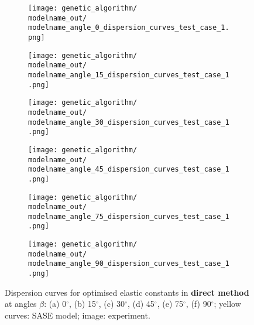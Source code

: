 \documentclass[preprint,12pt]{elsarticle}
\begin{document}
\clearpage

\begin{figure} [h!]
	\newcommand{\modelname}{ga_plain_weave_C_tensor_known_mass}
	\centering
	\begin{subfigure}[b]{0.49\textwidth}
		\centering
		
\texttt{[image: genetic\_algorithm/\\modelname\_out/\\modelname\_angle\_0\_dispersion\_curves\_test\_case\_1.png]}
		\caption{}
		\label{fig:dispersion0deg_direct}
	\end{subfigure}
	\begin{subfigure}[b]{0.49\textwidth}
		\centering
		
\texttt{[image: genetic\_algorithm/\\modelname\_out/\\modelname\_angle\_15\_dispersion\_curves\_test\_case\_1.png]}
		\caption{}
		\label{fig:dispersion15deg_direct}
	\end{subfigure}
	\begin{subfigure}[b]{0.49\textwidth}
		\centering
		
\texttt{[image: genetic\_algorithm/\\modelname\_out/\\modelname\_angle\_30\_dispersion\_curves\_test\_case\_1.png]}
		\caption{}
		\label{fig:dispersion30deg_direct}
	\end{subfigure}
	\begin{subfigure}[b]{0.49\textwidth}
		\centering
		
\texttt{[image: genetic\_algorithm/\\modelname\_out/\\modelname\_angle\_45\_dispersion\_curves\_test\_case\_1.png]}
		\caption{}
		\label{fig:dispersion45deg_direct}
	\end{subfigure}
	\begin{subfigure}[b]{0.49\textwidth}
		\centering
		
\texttt{[image: genetic\_algorithm/\\modelname\_out/\\modelname\_angle\_75\_dispersion\_curves\_test\_case\_1.png]}
		\caption{}
		\label{fig:dispersion75deg_direct}
	\end{subfigure}
	\begin{subfigure}[b]{0.49\textwidth}
		\centering
		
\texttt{[image: genetic\_algorithm/\\modelname\_out/\\modelname\_angle\_90\_dispersion\_curves\_test\_case\_1.png]}
		\caption{}
		\label{fig:dispersion90deg_direct}
	\end{subfigure}
	\caption{Dispersion curves for optimised elastic constants in \textbf{direct method} 
	at angles \(\beta\): (a) 0\(^{\circ}\), (b) 15\(^{\circ}\), (c) 30\(^{\circ}\), (d) 
	45\(^{\circ}\), 
	(e) 
	75\(^{\circ}\), (f) 90\(^{\circ}\); yellow curves: SASE model; image: experiment. }
	\label{fig:optimized_direct}
\end{figure}
\end{document}
